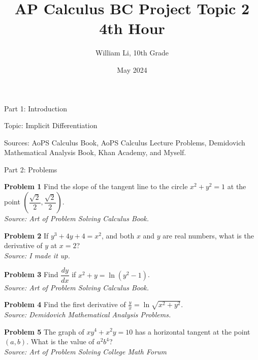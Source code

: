 \documentclass{article}
\title{AP Calculus BC Project Topic 2 4th Hour}
\author{William Li, 10th Grade}
\date{May 2024}
\begin{document}
\maketitle

\LARGE Part 1: Introduction

\hspace{1cm}

\Large Topic: Implicit Differentiation

Sources: AoPS Calculus Book, AoPS Calculus Lecture Problems, Demidovich Mathematical Analysis Book, Khan Academy, and Myself.



\newpage

\begin{comment}
	Implicit Differentiation Problems
\end{comment}

\LARGE Part 2: Problems

\vspace{2cm}

\large

\textbf{Problem 1} Find the slope of the tangent line to the circle $x^2 + y^2 = 1$ at the point $\left( \dfrac {\sqrt{2}} {2}, \dfrac {\sqrt {2}} {2} \right)$.\\
\textit{Source: Art of Problem Solving Calculus Book.}

\vspace{1cm}

\textbf{Problem 2} If $y^3 + 4y + 4 = x^2$, and both $x$ and $y$ are real numbers, what is the derivative of $y$ at $x = 2$?\\
\textit{Source: I made it up.}

\vspace{1cm}

\textbf{Problem 3} Find $\dfrac {dy} {dx}$ if $x^2 + y = \ln(y^2 - 1)$.\\
\textit{Source: Art of Problem Solving Calculus Book.}

\vspace{1cm}

\textbf{Problem 4} Find the first derivative of $\frac {y} {x} = \ln \sqrt{x^2 + y^2}$.\\
\textit{Source: Demidovich Mathematical Analysis Problems.}\\

\vspace{1cm}

\textbf{Problem 5} The graph of $xy^4 + x^2y = 10$ has a horizontal tangent at the point $(a , b)$. What is the value of $a^2b^4$?\\
\textit{Source: Art of Problem Solving College Math Forum}
\end{document}
